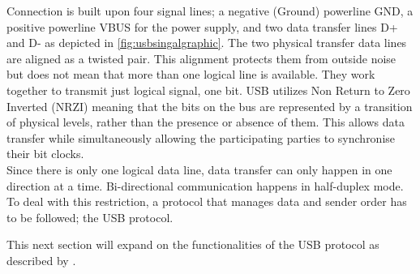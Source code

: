 Connection is built upon four signal lines; a negative (Ground) powerline GND, a positive powerline VBUS for the power supply, and two data transfer lines D+ and D- as depicted in \ref{fig:usbsingalgraphic}. The two physical transfer data lines are aligned as a twisted pair. This alignment protects them from outside noise but does not mean that more than one logical line is available. They work together to transmit just logical signal, one bit. USB utilizes Non Return to Zero Inverted (NRZI) meaning that the bits on the bus are represented by a transition of physical levels, rather than the presence or absence of them. This allows data transfer while simultaneously allowing the participating parties to synchronise their bit clocks.  \\
Since there is only one logical data line, data transfer can only happen in one direction at a time. Bi-directional communication happens in half-duplex mode. To deal with this restriction, a protocol that manages data and sender order has to be followed; the USB protocol.  

This next section will expand on the functionalities of the USB protocol as described by \cite{nissimUSBbasedAttacks2017}. 

